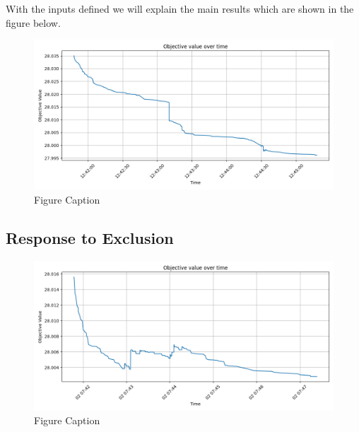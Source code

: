 \documentclass[preprint,12pt,authoryear]{elsarticle}
\begin{document}
With the inputs defined we will explain the main results which are shown in the figure below. 
\begin{figure}[H]%
\centering%
\includegraphics[width=1.0\textwidth]{../figures/objective.png}
\caption{Figure Caption}\label{fig1}
\end{figure}


\subsection{Response to Exclusion}
\begin{figure}[H]%
\centering%
\includegraphics[width=1.0\textwidth]{../figures/objective-400-exclusions.png}
\caption{Figure Caption}\label{fig:objective-exclusion-400}
\end{figure}
\end{document}
